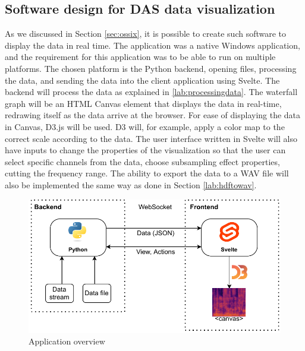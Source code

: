 





\subsection{Software design for DAS data visualization}

As we discussed in Section \ref{sec:ossix}, it is possible to create such software to display the data in real time. The application was a native Windows application, and the requirement for this application was to be able to run on multiple platforms. The chosen platform is the Python backend, opening files, processing the data, and sending the data into the client application using Svelte. The backend will process the data as explained in \ref{lab:processingdata}. The waterfall graph will be an HTML Canvas element that displays the data in real-time, redrawing itself as the data arrive at the browser. For ease of displaying the data in Canvas, D3.js will be used. D3 will, for example, apply a color map to the correct scale according to the data. The user interface written in Svelte will also have inputs to change the properties of the visualization so that the user can select specific channels from the data, choose subsampling effect properties, cutting the frequency range. The ability to export the data to a WAV file will also be implemented the same way as done in Section \ref{lab:hdftowav}.

\begin{figure}
    \centering
    \includegraphics{obrazky/appstack.drawio.pdf}
    \caption{Application overview}
    \label{fig:app_overview}
\end{figure}


